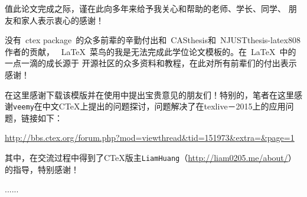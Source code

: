 \begin{thanks}


值此论文完成之际，谨在此向多年来给予我关心和帮助的老师、学长、同学、
朋友和家人表示衷心的感谢！

没有~ctex package~的众多前辈的辛勤付出和~CASthesis和~NJUSTthesis-latex808作者的贡献，
~\LaTeX{}~菜鸟的我是无法完成此学位论文模板的。在~\LaTeX{}~中的一点一滴的成长源于
开源社区的众多资料和教程，在此对所有前辈们的付出表示感谢！

在这里感谢下载该模版并在使用中提出宝贵意见的朋友们！特别的，笔者在这里感谢\texttt{veemy}在中文CTeX上提出的问题探讨，问题解决了在texlive－2015上的应用问题，链接如下：

\url{http://bbs.ctex.org/forum.php?mod=viewthread&tid=151973&extra=&page=1}

其中，在交流过程中得到了CTeX版主\texttt{LiamHuang}（\url{http://liam0205.me/about/}）的指导，特别感谢！

......

\vskip 18pt

\end{thanks}